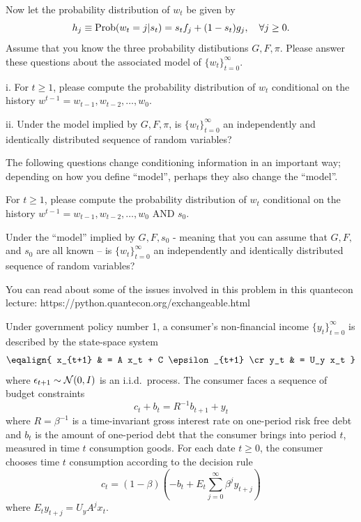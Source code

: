 \medskip
{} Now let  the probability distribution of $w_t$  be given by
$$ h_j \equiv {\rm Prob}(w_t = j | s_t)  = s_t f_j + (1-s_t) g_j ,  \quad \forall j \geq 0. $$
Assume that you know the three probability distibutions $G, F, \pi$.
Please answer these questions about the associated   model of  $\{w_t\}_{t=0}^\infty$.


\smallskip
\item{i.}  For $t \geq 1$,
please compute the probability distribution of  $w_t$ conditional on the history $w^{t-1} = w_{t-1}, w_{t-2}, \ldots, w_0$.


\item{ii.} Under the model implied by $G, F, \pi$, is $\{w_t\}_{t=0}^\infty$ an independently and identically distributed sequence of random variables?

\medskip


\noindent The following questions change conditioning information in an important way; depending on how you define ``model'', perhaps they also change the ``model''.


\medskip
{} For $t \geq 1$,
please compute the probability distribution of  $w_t$ conditional on  the history $w^{t-1} = w_{t-1}, w_{t-2}, \ldots, w_0$ AND $s_0$.

\medskip
{} Under the ``model'' implied by $G, F, s_0$  - meaning that you can assume that $G, F,$ and $s_0$ are all known --  is $\{w_t\}_{t=0}^\infty$ an independently and identically distributed sequence of random variables?

\medskip
{}  You can read about some of the issues involved in this problem in this quantecon lecture:
https://python.quantecon.org/exchangeable.html



\medskip
{} 

\medskip

\noindent Under government policy number 1, a consumer's non-financial income $\{y_t\}_{t=0}^\infty$  is described by the state-space system
$$ \eqalign{ x_{t+1} & = A x_t + C \epsilon_{t+1} \cr
              y_t & = U_y x_t }$$
where $\epsilon_{t+1} \sim {\cal N}(0,I)$ is an i.i.d.~process.  The consumer faces a sequence of budget constraints
$$ c_t + b_t = R^{-1} b_{t+1} + y_t$$
where $R = \beta^{-1}$ is a time-invariant gross interest rate on one-period risk free debt and $b_t$ is the amount of one-period debt that
the consumer brings into period $t$, measured in time $t$ consumption goods. For each date $t \geq 0$, the consumer chooses time $t$ consumption according to  the decision rule
$$ c_t = (1-\beta) (- b_t + E_t \sum_{j=0}^\infty \beta^j y_{t+j} ) $$
where $E_t y_{t+j} = U_y A^j x_t$.  

